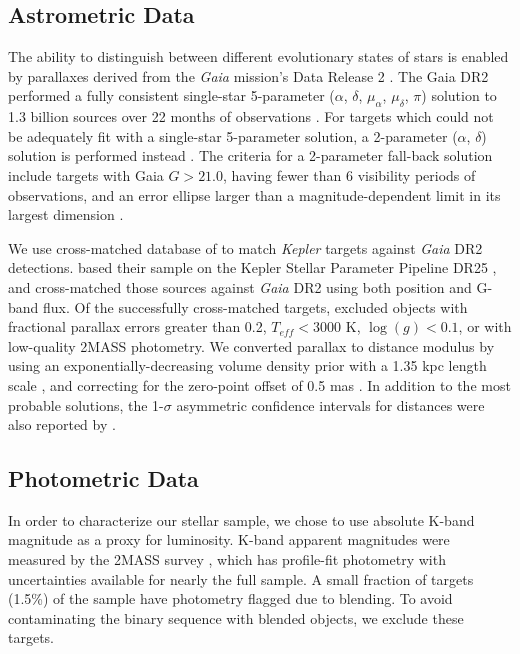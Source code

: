 \documentclass[manuscript]{aastex6}
\newcommand{\Kepler}{\mbox{\textit{Kepler}}}
\newcommand{\Gaia}{\mbox{\textit{Gaia}}}
\newcommand{\Teff}{\ensuremath{T_{eff}}}
\newcommand{\logg}{\ensuremath{\log(g)}}
\newcommand{\gvs}{\authorcomment1}
\begin{document}
\subsection{Astrometric Data}

The ability to distinguish between different evolutionary states of stars is
enabled by parallaxes derived from the \Gaia{} mission's Data Release 2
\citep{Gaia18}. The Gaia DR2 performed a fully consistent single-star
5-parameter (\(\alpha\), \(\delta\), \(\mu_\alpha\), \(\mu_\delta\), \(\pi\))
solution to 1.3 billion sources over 22 months of observations
\citep{Lindegren18}. For targets which could not be adequately fit with a
single-star 5-parameter solution, a 2-parameter (\(\alpha\), \(\delta\))
solution is performed instead \citep{Michalik15}. The criteria for a
2-parameter fall-back solution include targets with Gaia \(G > 21.0\), having
fewer than 6 visibility periods of observations, and an error ellipse larger
than a magnitude-dependent limit in its largest dimension \citep{Lindegren18}.


We use  cross-matched database of \citet{Berger18b} to match \Kepler{} targets
against \Gaia{} DR2 detections.
\citet{Berger18b} based their sample on the Kepler Stellar Parameter Pipeline
DR25 \citep{Mathur17}, and cross-matched those sources against \Gaia{} DR2
using both position and G-band flux. Of the successfully cross-matched targets,
\citet{Berger18b} excluded objects with fractional parallax errors greater than
0.2, \(\Teff < 3000\) K, \(\logg < 0.1\), or with low-quality 2MASS photometry. 
We converted parallax to distance modulus by using an
exponentially-decreasing volume density prior with a 1.35 kpc length scale
\citep{BailerJones15,Astraatmadja16}, and correcting for the zero-point offset
of 0.5 mas \citep{Zinn18}. \gvs{Should we include a table of this?} In 
addition to the most probable solutions, the 1-\(\sigma\) asymmetric 
confidence intervals for distances were also reported by \citet{Berger18b}.

\subsection{Photometric Data}

In order to characterize our stellar sample, we chose to use absolute K-band
magnitude as a proxy for luminosity. K-band apparent magnitudes were measured
by the 2MASS survey \citep{Skrutskie06}, which has profile-fit photometry with 
uncertainties available for nearly the full sample. A small fraction of 
targets (1.5\%) of the \citet{McQuillan14} sample have photometry flagged due
to blending. To avoid contaminating the binary sequence with blended objects,
we exclude these targets.
\end{document}

